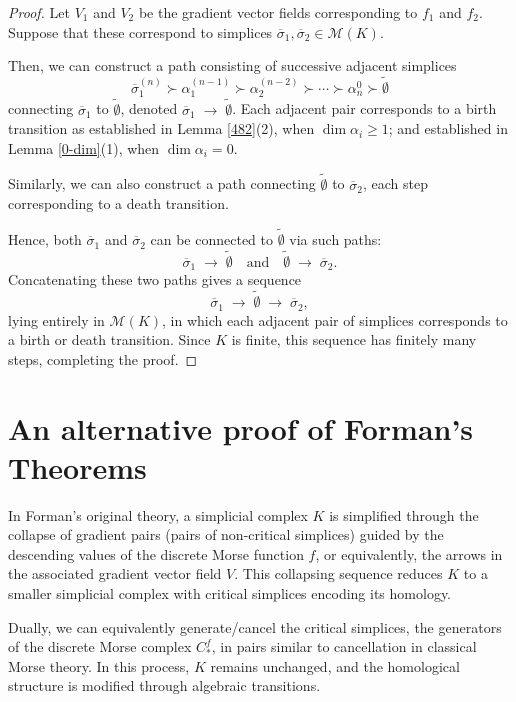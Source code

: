 \documentclass[a4paper,12pt,notitlepage]{amsart}
\theoremstyle{definition}%
\theoremstyle{definition}%
\theoremstyle{definition}%
\newcommand{\M}{\mathcal{M}}
\newcommand{\es}{\tilde{\emptyset}}
\begin{document}
\begin{proof}
Let $V_1$ and $V_2$ be 
the gradient vector fields 
corresponding to $f_1$ and $f_2$. 
Suppose that these correspond to simplices 
$\overline{\sigma}_1, \overline{\sigma}_2 \in \mathcal{M}(K)$.
 
Then, we can construct a  path consisting of successive adjacent simplices
$$ \overline{\sigma}_1^{(n)} \succ  \alpha_1^{(n-1)} \succ \alpha_2^{(n-2)}\succ \cdots \succ \alpha_{n}^{0} \succ \es$$ 
 connecting  
$ \overline{\sigma}_1$ to $\es$,
denoted $\overline{\sigma}_1 \;\to\; \es$.
Each adjacent pair  
corresponds to   a birth transition
as established in Lemma \ref{482}(2), when $\dim \alpha_i \geq 1$;
and  established in Lemma \ref{0-dim}(1), when $\dim \alpha_i = 0$.

Similarly, 
we can also construct a  path 
connecting  
$\es$ to $ \overline{\sigma}_2$,
 each step corresponding to a death transition.

Hence, both $\overline{\sigma}_1$ and $\overline{\sigma}_2$ 
can be connected to $\es$ via such  paths:
\[
\overline{\sigma}_1 \;\to\; \es 
\quad \text{and} \quad 
\es \;\to\; \overline{\sigma}_2 .
\]
Concatenating these two paths gives a  sequence
\[
\overline{\sigma}_1 \;\to\; \es \;\to\; \overline{\sigma}_2 ,
\]
lying entirely in $\M(K)$, in which each adjacent pair of simplices 
corresponds to a birth or death transition. 
Since $K$ is finite, this sequence has finitely many steps, 
completing the proof.

\end{proof}


\section{An alternative proof of Forman's Theorems}
In Forman's original theory,  a simplicial complex  $K$ is simplified through the collapse of gradient 
pairs (pairs of non-critical simplices)
guided by the descending values of the discrete Morse function $f$,
or  equivalently,  the arrows  in the associated gradient vector field $V$.
This collapsing sequence
reduces $K$ to a smaller simplicial complex 
with critical simplices encoding its homology.

Dually,
we can equivalently generate/cancel the critical simplices, 
the generators of the discrete Morse complex $C_{\ast}^f$,
in pairs similar to cancellation in classical Morse theory.
In this process, $K$ remains unchanged,
and the homological structure is modified through algebraic transitions.
\end{document}
